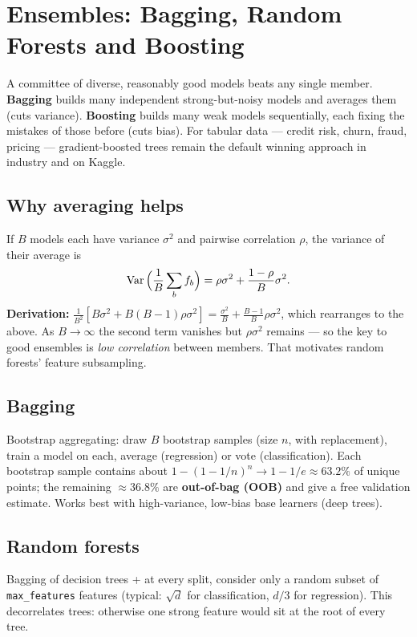 \chapter[Ensembles]{Ensembles: Bagging, Random Forests and Boosting}
\label{ch:ensembles}

\begin{intuition}
A committee of diverse, reasonably good models beats any single member. \textbf{Bagging} builds many independent strong-but-noisy models and averages them (cuts variance). \textbf{Boosting} builds many weak models sequentially, each fixing the mistakes of those before (cuts bias). For tabular data --- credit risk, churn, fraud, pricing --- gradient-boosted trees remain the default winning approach in industry and on Kaggle.
\end{intuition}

\section{Why averaging helps}
If $B$ models each have variance $\sigma^2$ and pairwise correlation $\rho$, the variance of their average is
\[\operatorname{Var}\Big(\frac1B\sum_bf_b\Big)=\rho\sigma^2+\frac{1-\rho}{B}\sigma^2.\]
\textbf{Derivation:} $\frac1{B^2}[B\sigma^2+B(B-1)\rho\sigma^2]=\frac{\sigma^2}{B}+\frac{B-1}{B}\rho\sigma^2$, which rearranges to the above. As $B\to\infty$ the second term vanishes but $\rho\sigma^2$ remains --- so the key to good ensembles is \emph{low correlation} between members. That motivates random forests' feature subsampling.

\section{Bagging}
Bootstrap aggregating: draw $B$ bootstrap samples (size $n$, with replacement), train a model on each, average (regression) or vote (classification). Each bootstrap sample contains about $1-(1-1/n)^n\to1-1/e\approx63.2\%$ of unique points; the remaining $\approx36.8\%$ are \textbf{out-of-bag (OOB)} and give a free validation estimate. Works best with high-variance, low-bias base learners (deep trees).

\section{Random forests}
Bagging of decision trees + at every split, consider only a random subset of \texttt{max\_features} features (typical: $\sqrt d$ for classification, $d/3$ for regression). This decorrelates trees: otherwise one strong feature would sit at the root of every tree.

